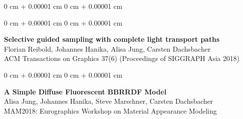 \documentclass[10pt, letterpaper]{article}
\newenvironment{onecolentry}{
    \begin{adjustwidth}{
        0 cm + 0.00001 cm
    }{
        0 cm + 0.00001 cm
    }
}{
    \end{adjustwidth}
} %
\begin{document}
\begin{samepage}
\begin{onecolentry}
    \end{onecolentry}
    \begin{onecolentry}
    \textbf{Selective guided sampling with complete light transport paths}\\
Florian Reibold, Johannes Hanika, Alisa Jung, Carsten Dachsbacher\\
ACM Transactions on Graphics 37(6) (Proceedings of SIGGRAPH Asia 2018)
    \end{onecolentry}
    \begin{onecolentry}
    \textbf{A Simple Diffuse Fluorescent BBRRDF Model}\\
    Alisa Jung, Johannes Hanika, Steve Marschner, Carsten Dachsbacher\\
    MAM2018: Eurographics Workshop on Material Appearance Modeling
    \end{onecolentry}
        \end{samepage}
\end{document}
